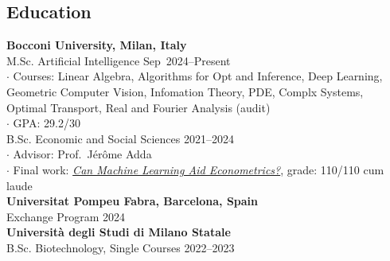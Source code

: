 \documentclass[margin,line]{res}
\begin{document}
\address{\small \href{mailto:matilde.dolfato@studbocconi.it}{matilde (dot) dolfato (at) studbocconi.it} \,\,  $|$ \,\,\href{https://github.com/matildedol}{github.com/matildedol} \,\,$|$ \,\, \href{https://linkedin.com/in/matilde-dolfato-556304177}{linkedin.com/in/matilde-dolfato}}

\begin{resume}

\normalsize
\vspace*{-4mm}
\section{\sc Education}
{\bf Bocconi University, Milan, Italy} \vspace*{0.5mm}\\
{M.Sc. Artificial Intelligence} \hfill Sep~2024--Present\vspace*{0.5mm}\\
$\cdot$ {\footnotesize Courses: Linear Algebra, Algorithms for Opt and Inference, Deep Learning, \\ Geometric Computer Vision, Infomation Theory, PDE, Complx Systems, \\
Optimal Transport, Real and Fourier Analysis (audit)\\}
$\cdot$ {\small GPA: 29.2/30 \vspace{2mm}\\}
{B.Sc. Economic and Social Sciences }\hfill 2021--2024 \vspace*{0.5mm}\\
 $\cdot$ {\small Advisor: Prof.\ J\'er\^ome Adda}\\
 $\cdot$ {\small Final work: \href{https://matildedol.github.io/files/bscthesis.pdf}{\textit{Can Machine Learning Aid Econometrics?}}, grade: 110/110 {cum laude}}\vspace{2mm}\\
{\bf Universitat Pompeu Fabra, Barcelona, Spain}\vspace*{0.5mm}\\
Exchange Program \hfill 2024\vspace{2mm}\\
{\bf Universit\`a degli Studi di Milano Statale}\vspace*{0.5mm}\\
B.Sc. Biotechnology, Single Courses \hfill 2022--2023\vspace*{-5mm}\\


\end{resume}
\end{document}
